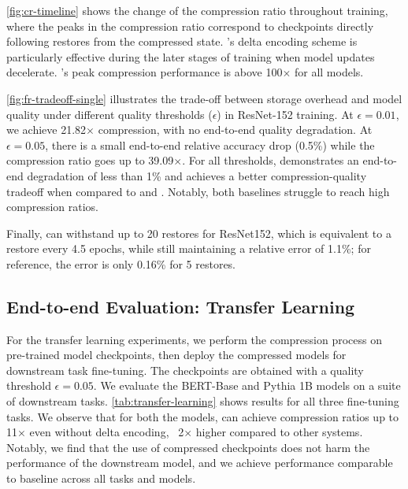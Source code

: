 \cref{fig:cr-timeline} shows the change of the compression ratio throughout training, where the peaks in the compression ratio correspond to checkpoints directly following restores from the compressed state. \sys's delta encoding scheme is particularly effective during the later stages of training when model updates decelerate. \sys's peak compression performance is above 100$\times$ for all models.



\cref{fig:fr-tradeoff-single} illustrates the trade-off between storage overhead and model quality under different quality thresholds ($\epsilon$) in ResNet-152 training. At $\epsilon=0.01$, we achieve 21.82$\times$ compression, with no end-to-end quality degradation. At $\epsilon=0.05$, there is a small end-to-end relative accuracy drop (0.5\%) while the compression ratio goes up to 39.09$\times$. For all thresholds, \sys demonstrates an end-to-end degradation of less than 1\% and achieves a better compression-quality tradeoff when compared to \CNR and \QD. Notably, both baselines struggle to reach high compression ratios.

Finally, \sys can withstand up to 20 restores for ResNet152, which is equivalent to a restore every 4.5 epochs, while still maintaining a relative error of 1.1\%; for reference, the error is only 0.16\% for 5 restores. 







\subsection{End-to-end Evaluation: Transfer Learning}
\label{sec:eval-contlearn}
For the transfer learning experiments, we perform the compression process on pre-trained model checkpoints, then deploy the compressed models for downstream task fine-tuning. The checkpoints are obtained with a quality threshold $\epsilon=0.05$.  We evaluate the BERT-Base and Pythia 1B models on a suite of downstream tasks. \cref{tab:transfer-learning} shows results for all three fine-tuning tasks. We observe that for both the models, \sys can achieve compression ratios up to 11$\times$ even without delta encoding, ~2$\times$ higher compared to other systems. Notably, we find that the use of compressed checkpoints does not harm the performance of the downstream model, and we achieve performance comparable to baseline across all tasks and models.

